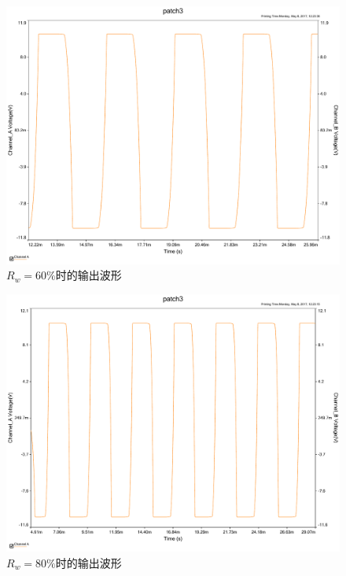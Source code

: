 \documentclass[UTF8,a4paper]{paper}
\begin{document}
\begin{multicols}{2}
\begin{figure}[H]
\includegraphics[width=\columnwidth]{60ac.pdf}
\caption{$R_w=60\%$时的输出波形}
\label{60}
\end{figure}
\begin{figure}[H]
\centering
\includegraphics[width=\columnwidth]{80ac.pdf}
\caption{$R_w=80\%$时的输出波形}
\label{80}
\end{figure}
\begin{figure}[H]
\centering

\end{figure}
\end{multicols}
\end{document}
